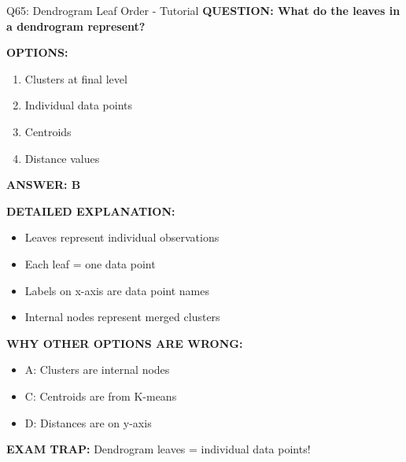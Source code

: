 \documentclass[8pt]{beamer}
\begin{document}
	\begin{frame}{Q65: Dendrogram Leaf Order - Tutorial}
		\fontsize{6.5}{7.5}\selectfont
		\textbf{QUESTION: What do the leaves in a dendrogram represent?}
		
		\vspace{0.1cm}
		\textbf{OPTIONS:}
		\begin{enumerate}
			\item Clusters at final level
			\item Individual data points
			\item Centroids
			\item Distance values
		\end{enumerate}
		
		\vspace{0.1cm}
		\textcolor{myblue}{\textbf{ANSWER: B}}
		
		\vspace{0.1cm}
		\textbf{DETAILED EXPLANATION:}
		\begin{itemize}
			\item Leaves represent individual observations
			\item Each leaf = one data point
			\item Labels on x-axis are data point names
			\item Internal nodes represent merged clusters
		\end{itemize}
		
		\vspace{0.1cm}
		\textcolor{myred}{\textbf{WHY OTHER OPTIONS ARE WRONG:}}
		\begin{itemize}
			\item \textcolor{myred}{A:} Clusters are internal nodes
			\item \textcolor{myred}{C:} Centroids are from K-means
			\item \textcolor{myred}{D:} Distances are on y-axis
		\end{itemize}
		
		\textcolor{myred}{\textbf{EXAM TRAP:}} Dendrogram leaves = \textcolor{myblue}{individual data points}!
	\end{frame}
	
	
\end{document}
